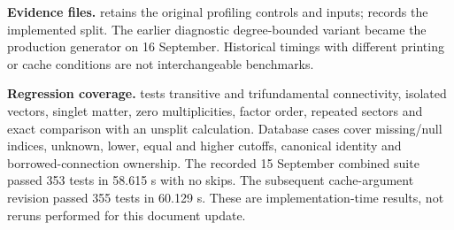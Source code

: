 \textbf{Evidence files.} 
retains the original profiling controls and inputs;
 records the
implemented split. The earlier diagnostic degree-bounded variant became the
production generator on 16 September. Historical timings with different
printing or cache conditions are not interchangeable benchmarks.

\textbf{Regression coverage.}  tests
transitive and trifundamental connectivity, isolated vectors, singlet matter,
zero multiplicities, factor order, repeated sectors and exact comparison with
an unsplit calculation. Database cases cover missing/null indices, unknown,
lower, equal and higher cutoffs, canonical identity and borrowed-connection
ownership. The recorded 15 September combined suite passed 353 tests in
58.615 s with no skips. The subsequent cache-argument revision passed 355
tests in 60.129 s. These are implementation-time results, not reruns performed
for this document update.
